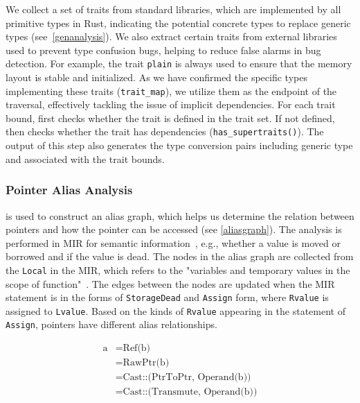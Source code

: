 \vspace{0.05in}
{
We collect a set of traits from standard libraries, which are implemented by all primitive types in Rust, indicating the potential concrete types to replace generic types (see~\autoref{genanalysis}).
%
We also extract certain traits from external libraries used to prevent type confusion bugs, helping to reduce false alarms in bug detection.
%
For example, the trait \texttt{plain}\cite{plain} is always used to ensure that the memory layout is stable and initialized.
%
As we have confirmed the specific types implementing these traits (\texttt{trait\_map}), we utilize them as the endpoint of the traversal, effectively tackling the issue of implicit dependencies.
%
For each trait bound, \tyanalyzer first checks whether the trait is defined in the trait set.
If not defined, \tyanalyzer then checks whether the trait has dependencies (\texttt{has\_supertraits()}).
The output of this step also generates the type conversion pairs including generic type and associated with the trait bounds.
}

\subsubsection{Pointer Alias Analysis} \label{aliasanalysis}
\Analysistwo is used to construct an alias graph, which helps us determine the relation between pointers and how the pointer can be accessed (see \autoref{aliasgraph}).
The analysis is performed in MIR for semantic information~\cite{MIR}, e.g., whether a value is moved or borrowed and if the value is dead.
%
The nodes in the alias graph are collected from the \texttt{Local} in the MIR, which refers to the "variables and temporary values in the scope of function"~\cite{Local}. 
%
The edges between the nodes are updated when the MIR statement is in the forms of \texttt{StorageDead} and \texttt{Assign} form, where \texttt{Rvalue} is assigned to \texttt{Lvalue}. %
Based on the kinds of \texttt{Rvalue} appearing in the statement of \texttt{Assign}, pointers have different alias relationships.

\begin{equation} \label{assign}
    \begin{aligned}
        \text{a} &= \text{Ref(b)} \\
                     &= \text{RawPtr(b)} \\
                     &= \text{Cast::(PtrToPtr, Operand(b))} \\
                     &= \text{Cast::(Transmute, Operand(b))}
    \end{aligned}
\end{equation}


